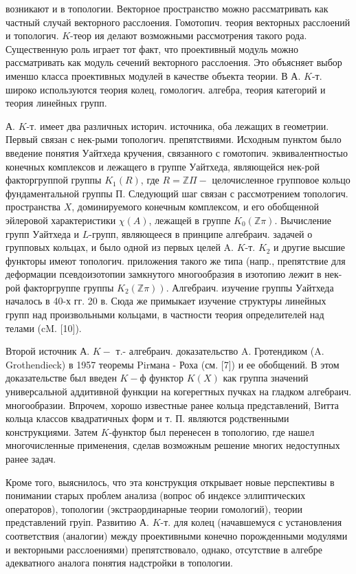 \documentclass[10pt]{article}
\begin{document}
возникают и в топологии. Векторное пространство можно рассматривать как частный случай векторного расслоения. Гомотопич. теория векторных расслоений и топологич. $K$-теор ия делают возможными рассмотрения такого рода. Существенную роль играет тот факт, что проективный модуль можно рассматривать как модуль сечений векторного расслоения. Это объясняет выбор именшо класса проективных модулей в качестве объекта теории. В А. $K$-т. широко используются теория колец, гомологич. алгебра, теория категорий и теория линейных групп.



А. $K$-т. имеет два различных историч. источника, оба лежащих в геометрии. Первый связан с нек-рыми топологич. препятствиями. Исходным пунктом было введение понятия Уайтхеда кручения, связанного с гомотопич. эквивалентностыо конечных комплексов и лежащего в группе Уайтхеда, являющейся нек-рой факторгруппой группы $K_{1}(R)$, где $R=\mathbb{Z} \Pi-$ целочисленное групповое кольцо фундаментальной группы П. Следующий шаг связан с рассмотрением топологич. пространства $X$, доминируемого конечным комплексом, и его обобщенной эйлеровой характеристики $\chi(A)$, лежащей в группе $K_{0}(\mathbb{Z} \pi)$. Вычисление групп Уайтхеда и $L$-групп, являющееся в принципе алгебраич. задачей о групповых кольцах, и было одной из первых целей A. $K$-т. $K_{2}$ и другие высшие функторы имеют топологич. приложения такого же типа (напр., препятствие для деформации псевдоизотопии замкнутого многообразия в изотопию лежит в нек-рой факторгруппе группы $\left.K_{2}(\mathbb{Z} \pi)\right)$. Алгебраич. изучение группы Уайтхеда началось в 40-х гг. 20 в. Сюда же примыкает изучение структуры линейных групп над произвольными кольцами, в частности теория определителей над телами (cM. [10]).



Второй источник А. $K-$ т.- алгебраич. доказательство A. Гротендиком (A. Grothendieck) в 1957 теоремы Pirмана - Роха (см. [7]) и ее обобщений. В этом доказательстве был введен $K-ф$ функтор $K(X)$ как группа значений универсальной аддитивной функции на когерегтных пучках на гладком алгебраич. многообразии. Впрочем, хорошо известные ранее кольца представлений, Bитта кольца классов квадратичных форм и т. П. являются родственными конструкциями. Затем $K$-функтор был перенесен в топологию, где нашел многочисленные применения, сделав возможным решение многих недоступных ранее задач.



Кроме того, выяснилось, что эта конструкция открывает новые перспективы в понимании старых проблем анализа (вопрос об индексе эллиптических операторов), топологии (экстраординарные теории гомологий), теории представлений груіп. Развитию А. $K$-т. для колец (начавшемуся с установления соответствия (аналогии) между проективными конечно порожденными модулями и векторными расслоениями) препятствовало, однако, отсутствие в алгебре адекватного аналога понятия надстройки в топологии.
\end{document}
